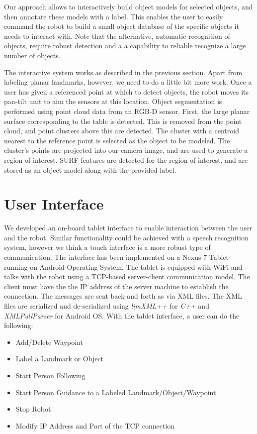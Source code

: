 Our approach allows to interactively build object models for selected objects, and then annotate these models with a label. This enables the user to easily command the robot to build a small object database of the specific objects it needs to interact with. Note that the alternative, automatic recognition of objects, require robust detection and a a capability to reliable recognize a large number of objects.

The interactive system works as described in the previous section. Apart from labeling planar landmarks, however, we need to do a little bit more work. Once a user has given a referenced point at which to detect
objects, the robot moves its pan-tilt unit to aim the sensors
at this location. Object segmentation is performed using
point cloud data from an RGB-D sensor. First, the large
planar surface corresponding to the table is detected. This
is removed from the point cloud, and point clusters above
this are detected. The cluster with a centroid nearest to the
reference point is selected as the object to be modeled. The
cluster’s points are projected into our camera image, and
are used to generate a region of interest. SURF features are
detected for the region of interest, and are stored as an object
model along with the provided label.

\section{User Interface}
\label{sec:map_ui}

We developed an on-board tablet interface to enable interaction between the user and the robot. Similar functionality could be achieved with a speech recognition system, however we think a touch interface is a more robust type of communication. The interface has been implemented on a Nexus 7 Tablet running on Android Operating System. The tablet is equipped with WiFi and talks with the robot using a TCP-based server-client communication model. The client must have the the IP address of the server machine to establish the connection. The messages are sent back-and forth as via XML files. The XML files are serialized and de-serialized using \textit{limXML++} for \textit{C++} and \textit{XMLPullParser} for Android OS. With the tablet interface, a user can do the following:

\begin{itemize}
\item Add/Delete Waypoint
\item Label a Landmark or Object
\item Start Person Following
\item Start Person Guidance to a Labeled Landmark/Object/Waypoint
\item Stop Robot
\item Modify IP Address and Port of the TCP connection
\end{itemize}

